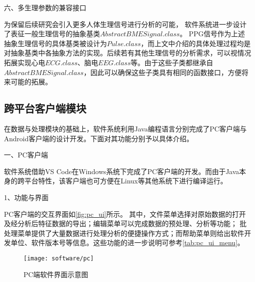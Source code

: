 
六、多生理参数的兼容接口

为保留后续研究会引入更多人体生理信号进行分析的可能，
软件系统进一步设计了表征一般生理信号的抽象基类$AbstractBMESignal.class$。
PPG信号作为上述抽象生理信号的具体基类被设计为$Pulse.class$，而上文中介绍的具体处理过程均是对抽象基类中各抽象方法的实现。后续若有其他生理信号的分析需求，可以视情况
拓展实现心电$ECG.class$、脑电$EEG.class$等。由于这些子类都继承自$AbstractBMESignal.class$，因此可以确保这些子类具有相同的函数接口，方便将来可能的拓展。

\subsection{跨平台客户端模块}

在数据与处理模块的基础上，软件系统利用Java编程语言分别完成了PC客户端与Android客户端的设计开发。下面对其功能分别予以具体介绍。

一、PC客户端

软件系统借助VS Code在Windows系统下完成了PC客户端的开发。而由于Java本身的跨平台特性，该客户端也可方便在Linux等其他系统下进行编译运行。

1、功能与界面

PC客户端的交互界面如\autoref{fig:pc_ui}所示。%
其中，文件菜单选择对原始数据的打开及经分析后特征数据的导出；编辑菜单可以完成数据的预处理、分析等功能；
批处理菜单提供了大量数据进行处理分析的便捷操作方式；而帮助菜单则给出软件开发单位、软件版本号等信息。这些功能的进一步说明可参考\autoref{tab:pc_ui_menu}。

\begin{figure}[h]
    \centering
    \texttt{[image: software/pc]}
    \caption{\label{fig:pc_ui}PC端软件界面示意图}
\end{figure}

